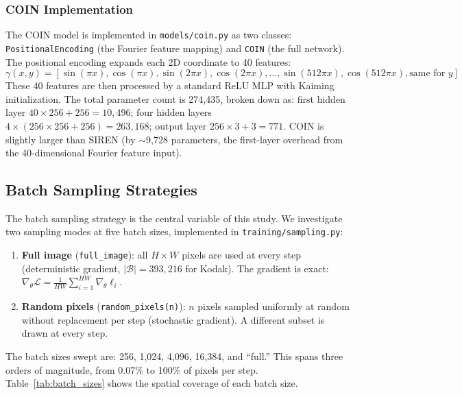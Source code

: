 \documentclass[a4paper,oneside,11pt,english]{scrartcl}
\begin{document}
\subsubsection{COIN Implementation}

The COIN model is implemented in \texttt{models/coin.py} as two classes:
\texttt{PositionalEncoding} (the Fourier feature mapping) and \texttt{COIN}
(the full network).  The positional encoding expands each 2D coordinate to
40 features:
\begin{equation}
    \gamma(x, y) = [\sin(\pi x), \cos(\pi x), \sin(2\pi x),
    \cos(2\pi x), \ldots, \sin(512\pi x), \cos(512\pi x),
    \text{same for } y]
\end{equation}
These 40 features are then processed by a standard ReLU MLP with Kaiming
initialization.  The total parameter count is 274{,}435, broken down as:
first hidden layer $40 \times 256 + 256 = 10{,}496$; four hidden layers
$4 \times (256 \times 256 + 256) = 263{,}168$; output layer $256 \times 3 + 3 =
771$.  COIN is slightly larger than SIREN (by $\sim$9{,}728 parameters, the
first-layer overhead from the 40-dimensional Fourier feature input).

\subsection{Batch Sampling Strategies}
\label{sec:sampling}

The batch sampling strategy is the central variable of this study.  We
investigate two sampling modes at five batch sizes, implemented in
\texttt{training/sampling.py}:

\begin{enumerate}
    \item \textbf{Full image} (\texttt{full\_image}): all $H \times W$ pixels
          are used at every step (deterministic gradient,
          $|\mathcal{B}| = 393{,}216$ for Kodak).  The gradient is exact:
          $\nabla_\theta \mathcal{L} = \frac{1}{HW} \sum_{i=1}^{HW}
          \nabla_\theta \ell_i$.
    \item \textbf{Random pixels} (\texttt{random\_pixels(n)}): $n$ pixels
          sampled uniformly at random without replacement per step
          (stochastic gradient).  A different subset is drawn at every step.
\end{enumerate}

The batch sizes swept are: 256, 1{,}024, 4{,}096, 16{,}384, and ``full.''
This spans three orders of magnitude, from 0.07\% to 100\% of pixels per
step.  Table~\ref{tab:batch_sizes} shows the spatial coverage of each batch
size.
\end{document}
